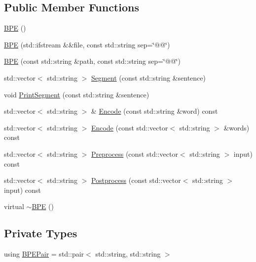 \subsection*{Public Member Functions}
\begin{DoxyCompactItemize}
\item 
\hyperlink{classamunmt_1_1BPE_a53dcd415e0e191be7cc8eb151ad6f17f}{B\+PE} ()
\item 
\hyperlink{classamunmt_1_1BPE_a973584c4eff31587d0cbbe3ccd9fc2a8}{B\+PE} (std\+::ifstream \&\&file, const std\+::string sep=\char`\"{}@@\char`\"{})
\item 
\hyperlink{classamunmt_1_1BPE_aed88644889fcbac579c7fb60b667f1f8}{B\+PE} (const std\+::string \&path, const std\+::string sep=\char`\"{}@@\char`\"{})
\item 
std\+::vector$<$ std\+::string $>$ \hyperlink{classamunmt_1_1BPE_a747e84ef0632faa5cb75994a09e64819}{Segment} (const std\+::string \&sentence)
\item 
void \hyperlink{classamunmt_1_1BPE_ad00d419cc8a541b8aad84501ab053db8}{Print\+Segment} (const std\+::string \&sentence)
\item 
std\+::vector$<$ std\+::string $>$ \& \hyperlink{classamunmt_1_1BPE_a31bddda15c8e822540612885885e3a3a}{Encode} (const std\+::string \&word) const 
\item 
std\+::vector$<$ std\+::string $>$ \hyperlink{classamunmt_1_1BPE_adb07fcf335a9fd4caf8a21b413d8c17f}{Encode} (const std\+::vector$<$ std\+::string $>$ \&words) const 
\item 
std\+::vector$<$ std\+::string $>$ \hyperlink{classamunmt_1_1BPE_ae394375a674cfeee1c36b56cb918f015}{Preprocess} (const std\+::vector$<$ std\+::string $>$ input) const 
\item 
std\+::vector$<$ std\+::string $>$ \hyperlink{classamunmt_1_1BPE_a219913023dc7826e0a5a731b0e26acc0}{Postprocess} (const std\+::vector$<$ std\+::string $>$ input) const 
\item 
virtual \hyperlink{classamunmt_1_1BPE_acf567c8b17acc29f0f9aaebe1652ba5b}{$\sim$\+B\+PE} ()
\end{DoxyCompactItemize}
\subsection*{Private Types}
\begin{DoxyCompactItemize}
\item 
using \hyperlink{classamunmt_1_1BPE_a3c38d7a027b9574c2b0baf3cd17f8e9c}{B\+P\+E\+Pair} = std\+::pair$<$ std\+::string, std\+::string $>$
\end{DoxyCompactItemize}
